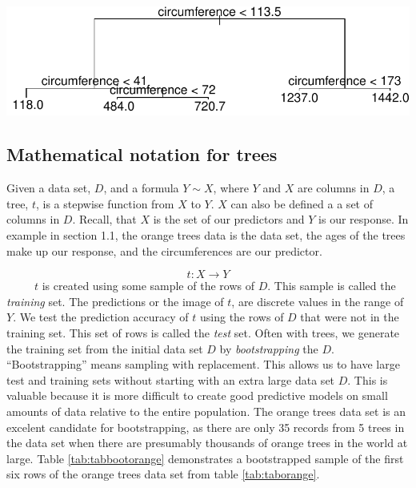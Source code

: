 \documentclass[12pt,twoside]{reedthesis}
\let\origfigure\figure
\let\endorigfigure\endfigure
\renewenvironment{figure}[1][2] {
    \expandafter\origfigure\expandafter[H]
} {
    \endorigfigure
}
\begin{document}
  \begin{figure}[H]
  
  {\centering \includegraphics{Thesis_files/figure-latex/unnamed-chunk-7-1} 
  
  }
  
  \caption{\label{fig:figorangeTree}A tree representing age \(\sim\) trunk circumference in orange trees.}\label{fig:unnamed-chunk-7}
  \end{figure}
  
  \subsection{Mathematical notation for
  trees}\label{mathematical-notation-for-trees}
  
  Given a data set, \(D\), and a formula \(Y \sim X\), where \(Y\) and
  \(X\) are columns in \(D\), a tree, \(t\), is a stepwise function from
  \(X\) to \(Y\). \(X\) can also be defined a a set of columns in \(D\).
  Recall, that \(X\) is the set of our predictors and \(Y\) is our
  response. In example in section 1.1, the orange trees data is the data
  set, the ages of the trees make up our response, and the circumferences
  are our predictor.
  
  \[t: X \rightarrow Y\] ~~~~~\(t\) is created using some sample of the
  rows of \(D\). This sample is called the \emph{training} set. The
  predictions or the image of \(t\), are discrete values in the range of
  \(Y\). We test the prediction accuracy of \(t\) using the rows of \(D\)
  that were not in the training set. This set of rows is called the
  \emph{test} set. Often with trees, we generate the training set from the
  initial data set \(D\) by \emph{bootstrapping} the \(D\).
  ``Bootstrapping'' means sampling with replacement. This allows us to
  have large test and training sets without starting with an extra large
  data set \(D\). This is valuable because it is more difficult to create
  good predictive models on small amounts of data relative to the entire
  population. The orange trees data set is an excelent candidate for
  bootstrapping, as there are only 35 records from 5 trees in the data set
  when there are presumably thousands of orange trees in the world at
  large. Table \ref{tab:tabbootorange} demonstrates a bootstrapped sample
  of the first six rows of the orange trees data set from table
  \ref{tab:taborange}.
  
\end{document}
